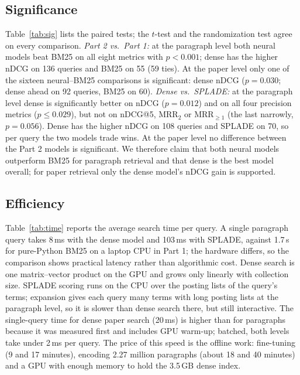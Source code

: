 \documentclass[sigconf,nonacm]{acmart}
\begin{document}
\subsection{Significance}
Table~\ref{tab:sig} lists the paired tests; the $t$-test and the randomization test agree on every comparison. \emph{Part 2 vs.\ Part 1:} at the paragraph level both neural models beat BM25 on all eight metrics with $p<0.001$; dense has the higher nDCG on 136 queries and BM25 on 55 (59 ties). At the paper level only one of the sixteen neural--BM25 comparisons is significant: dense nDCG ($p=0.030$; dense ahead on 92 queries, BM25 on 60). \emph{Dense vs.\ SPLADE:} at the paragraph level dense is significantly better on nDCG ($p=0.012$) and on all four precision metrics ($p\le0.029$), but not on nDCG@5, MRR$_{2}$ or MRR$_{\ge1}$ (the last narrowly, $p=0.056$). Dense has the higher nDCG on 108 queries and SPLADE on 70, so per query the two models trade wins. At the paper level no difference between the Part 2 models is significant. We therefore claim that both neural models outperform BM25 for paragraph retrieval and that dense is the best model overall; for paper retrieval only the dense model's nDCG gain is supported.

\subsection{Efficiency}
Table~\ref{tab:time} reports the average search time per query. A single paragraph query takes 8\,ms with the dense model and 103\,ms with SPLADE, against 1.7\,s for pure-Python BM25 on a laptop CPU in Part 1; the hardware differs, so the comparison shows practical latency rather than algorithmic cost. Dense search is one matrix--vector product on the GPU and grows only linearly with collection size. SPLADE scoring runs on the CPU over the posting lists of the query's terms; expansion gives each query many terms with long posting lists at the paragraph level, so it is slower than dense search there, but still interactive. The single-query time for dense paper search (20\,ms) is higher than for paragraphs because it was measured first and includes GPU warm-up; batched, both levels take under 2\,ms per query. The price of this speed is the offline work: fine-tuning (9 and 17 minutes), encoding 2.27 million paragraphs (about 18 and 40 minutes) and a GPU with enough memory to hold the 3.5\,GB dense index.
\end{document}
